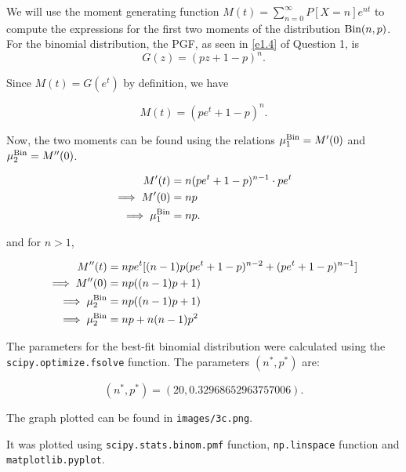 
We will use the moment generating function
$M(t) = \sum_{n=0}^{\infty}P[X=n]e^{nt}$ to compute the expressions for the first
two moments of the distribution $\text{Bin}(n, p)$. For the binomial distribution, the
PGF, as seen in \ref{e1.4} of Question 1, is
\begin{equation*}
    G(z) = (pz+1-p)^n.
\end{equation*}

Since $M(t)=G(e^t)$ by definition, we have

\begin{equation*}
    M(t) = (pe^t+1-p)^n.
\end{equation*}

Now, the two moments can be found using the relations $\mu_1^{\text{Bin}}=M'(0)$ and
$\mu_2^{\text{Bin}}=M''(0)$.

\begin{equation*}
    \begin{aligned}
        M'(t) &= n(pe^t+1-p)^{n-1}\cdot pe^t \\
        \implies M'(0) &= np \\
        \implies \mu_1^{\text{Bin}} &= np.
    \end{aligned}
\end{equation*}

and for $n>1$,

\begin{equation*}
    \begin{aligned}
        M''(t) &= npe^t[(n-1)p(pe^t+1-p)^{n-2}+(pe^t+1-p)^{n-1}] \\
        \implies M''(0) &= np((n-1)p+1) \\
        \implies \mu_2^{\text{Bin}} &= np((n-1)p+1) \\
        \implies \mu_2^{\text{Bin}} &= np+n(n-1)p^2   
    \end{aligned}
\end{equation*}

The parameters for the best-fit binomial distribution were calculated using the
\texttt{scipy.optimize.fsolve} function. The parameters $(n^*, p^*)$ are:

\begin{equation*}
    (n^*, p^*) = (20, 0.32968652963757006).
\end{equation*}

The graph plotted can be found in \texttt{images/3c.png}.

It was plotted using \texttt{scipy.stats.binom.pmf} function,
\texttt{np.linspace} function and \texttt{matplotlib.pyplot}.

